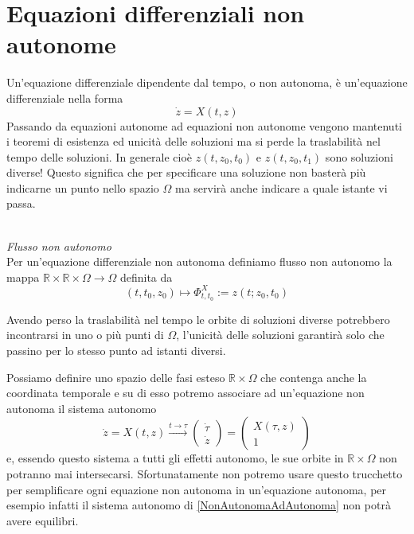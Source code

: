\documentclass[11pt,a4paper,twoside]{book}
\newenvironment{definizione}[1][\empty]{\begin{Definizione}{
\ifx\empty#1\relax\else\mdseries\itshape#1\\\fi
}{}}{\end{Definizione}}
\theoremstyle{esss}
\theoremstyle{dotless}
\numberwithin{equation}{section} %
\begin{document}
\section{Equazioni differenziali non autonome}

Un'equazione differenziale dipendente dal tempo, o non autonoma, è un'equazione differenziale nella forma
\begin{equation}
\dot{z}=X(t,z)
\end{equation}
Passando da equazioni autonome ad equazioni non autonome vengono mantenuti i teoremi di esistenza ed unicità delle soluzioni ma si perde la traslabilità nel tempo delle soluzioni.
In generale cioè $z(t,z_0,t_0)$ e $z(t,z_0,t_1)$ sono soluzioni diverse!
Questo significa che per specificare una soluzione non basterà più indicarne un punto nello spazio $\Omega$  ma servirà anche indicare a quale istante vi passa.

\begin{definizione}\textit{Flusso non autonomo}\\
Per un'equazione differenziale non autonoma definiamo flusso non autonomo la mappa $\mathbb{R}\times\mathbb{R}\times\Omega\rightarrow\Omega$ definita da
\[
(t,t_0,z_0)\mapsto\Phi^X_{t,t_0} := z(t;z_0,t_0)
\]
\end{definizione}

Avendo perso la traslabilità nel tempo le orbite di soluzioni diverse potrebbero incontrarsi in uno o più punti di $\Omega$, l'unicità delle soluzioni garantirà solo che passino per lo stesso punto ad istanti diversi.

Possiamo definire uno spazio delle fasi esteso $\mathbb{R}\times\Omega$ che contenga anche la coordinata temporale e su di esso potremo associare ad un'equazione non autonoma il sistema autonomo
\begin{equation}\label{NonAutonomaAdAutonoma}
\dot{z}=X(t,z) \overset{t\rightarrow \tau}{\longrightarrow}
\left(\begin{array}{c}
\dot{\tau}\\
\dot{z} 
\end{array}\right)=\left(\begin{array}{c}
X(\tau,z) \\
1
\end{array}\right)
\end{equation}
e, essendo questo sistema a tutti gli effetti autonomo, le sue orbite in $\mathbb{R}\times\Omega$ non potranno mai intersecarsi.
Sfortunatamente non potremo usare questo trucchetto per semplificare ogni equazione non autonoma in un'equazione autonoma, per esempio infatti il sistema autonomo di \eqref{NonAutonomaAdAutonoma} non potrà avere equilibri.
\end{document}

